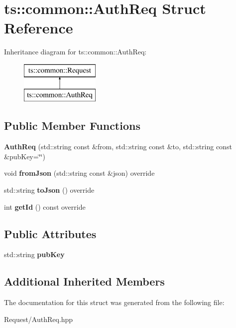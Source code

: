 \hypertarget{structts_1_1common_1_1_auth_req}{}\section{ts\+:\+:common\+:\+:Auth\+Req Struct Reference}
\label{structts_1_1common_1_1_auth_req}
Inheritance diagram for ts\+:\+:common\+:\+:Auth\+Req\+:\begin{figure}[H]
\begin{center}
\leavevmode
\includegraphics[height=2.000000cm]{structts_1_1common_1_1_auth_req}
\end{center}
\end{figure}
\subsection*{Public Member Functions}
\begin{DoxyCompactItemize}
\item 
\mbox{\label{structts_1_1common_1_1_auth_req_a68203d787f55a41a7a9d61c54c27e5f2}} 
{\bfseries Auth\+Req} (std\+::string const \&from, std\+::string const \&to, std\+::string const \&pub\+Key=\char`\"{}\char`\"{})
\item 
\mbox{\label{structts_1_1common_1_1_auth_req_add23cde2f1b4172b64c00688e7f1b3db}} 
void {\bfseries from\+Json} (std\+::string const \&json) override
\item 
\mbox{\label{structts_1_1common_1_1_auth_req_aafde04d1ffbf65d6789cba70a37320a0}} 
std\+::string {\bfseries to\+Json} () override
\item 
\mbox{\label{structts_1_1common_1_1_auth_req_a0d923334f66a22c644ad04dae909e4dd}} 
int {\bfseries get\+Id} () const override
\end{DoxyCompactItemize}
\subsection*{Public Attributes}
\begin{DoxyCompactItemize}
\item 
\mbox{\label{structts_1_1common_1_1_auth_req_a09f27d7320f0eb94cfb1c8bbfec6009b}} 
std\+::string {\bfseries pub\+Key}
\end{DoxyCompactItemize}
\subsection*{Additional Inherited Members}


The documentation for this struct was generated from the following file\+:\begin{DoxyCompactItemize}
\item 
Request/Auth\+Req.\+hpp\end{DoxyCompactItemize}
